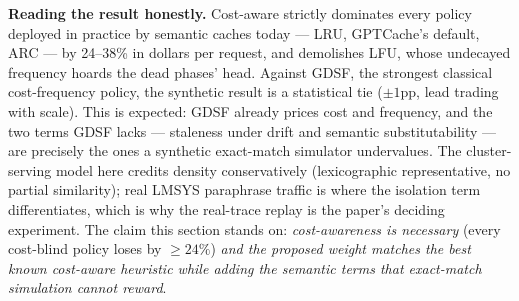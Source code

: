 \textbf{Reading the result honestly.} Cost-aware strictly dominates
every policy deployed in practice by semantic caches today --- LRU,
GPTCache's default, ARC --- by 24--38\% in dollars per request, and
demolishes LFU, whose undecayed frequency hoards the dead phases'
head. Against GDSF, the strongest classical cost-frequency policy, the
synthetic result is a statistical tie ($\pm 1$pp, lead trading with
scale). This is expected: GDSF already prices cost and frequency, and
the two terms GDSF lacks --- staleness under drift and semantic
substitutability --- are precisely the ones a synthetic exact-match
simulator undervalues. The cluster-serving model here credits density
conservatively (lexicographic representative, no partial similarity);
real LMSYS paraphrase traffic is where the isolation term differentiates,
which is why the real-trace replay is the paper's deciding experiment.
The claim this section stands on: \emph{cost-awareness is necessary}
(every cost-blind policy loses by ${\geq}24\%$) \emph{and the proposed
weight matches the best known cost-aware heuristic while adding the
semantic terms that exact-match simulation cannot reward}.
